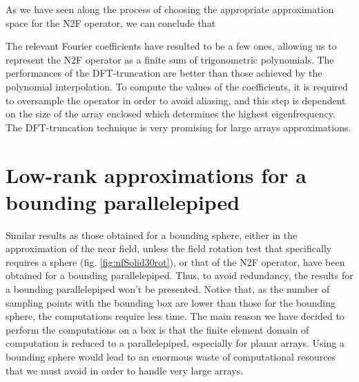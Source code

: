 \par As we have seen along the process of choosing the appropriate approximation space for the N2F operator, we can conclude that
\begin{mycc}
The relevant Fourier coefficients have resulted to be a few ones, allowing us to represent the N2F operator as a finite sum of trigonometric polynomials. The performances of the DFT-truncation are better than those achieved by the polynomial interpolation. To compute the values of the coefficients, it is required to oversample the operator in order to avoid aliasing, and this step is dependent on the size of the array enclosed which determines the highest eigenfrequency. The DFT-truncation technique is very promising for large arrays approximations.
\end{mycc}

\section{Low-rank approximations for a bounding parallelepiped}

\par Similar results as those obtained for a bounding sphere, either in the approximation of the near field, unless the field rotation test that specifically requires a sphere (fig. \ref{fig:nfSolid30rot}), or that of the N2F operator, have been obtained for a bounding parallelepiped. Thus, to avoid redundancy, the results for a bounding parallelepiped won't be presented. Notice that, as the number of sampling points with the bounding box are lower than those for the bounding sphere, the computations require less time. The main reason we have decided to perform the computations on a box is that the finite element domain of computation is reduced to a parallelepiped, especially for planar arrays. Using a bounding sphere would lead to an enormous waste of computational resources that we must avoid in order to handle very large arrays.

